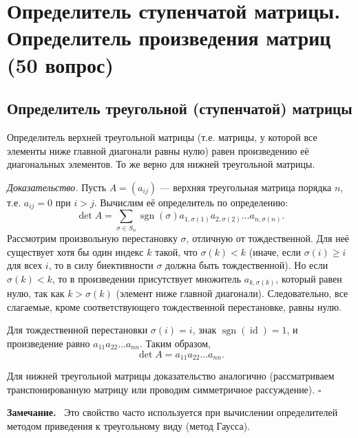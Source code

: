 \documentclass[a4paper,12pt]{article}
\newcommand{\myremark}{\textbf{Замечание.}\ }
\theoremstyle{definition}
\theoremstyle{plain}
\theoremstyle{remark}
\begin{document}
	\newpage
	\section{Определитель ступенчатой матрицы. Определитель произведения матриц (50 вопрос)}
	
	\subsection{Определитель треугольной (ступенчатой) матрицы}
	
	\begin{tcolorbox}[colback=blue!5, colframe=blue!40!black, title=Теорема]
		Определитель верхней треугольной матрицы (т.е. матрицы, у которой все элементы ниже главной диагонали равны нулю) равен произведению её диагональных элементов. То же верно для нижней треугольной матрицы.
	\end{tcolorbox}
	
	\medskip
	\textit{Доказательство.}
	Пусть \( A = (a_{ij}) \) — верхняя треугольная матрица порядка \( n \), т.е. \( a_{ij} = 0 \) при \( i > j \). Вычислим её определитель по определению:
	\[
	\det A = \sum_{\sigma \in S_n} \operatorname{sgn}(\sigma) a_{1,\sigma(1)} a_{2,\sigma(2)} \dots a_{n,\sigma(n)}.
	\]
	Рассмотрим произвольную перестановку \( \sigma \), отличную от тождественной. Для неё существует хотя бы один индекс \( k \) такой, что \( \sigma(k) < k \) (иначе, если \( \sigma(i) \geq i \) для всех \( i \), то в силу биективности \( \sigma \) должна быть тождественной). Но если \( \sigma(k) < k \), то в произведении присутствует множитель \( a_{k,\sigma(k)} \), который равен нулю, так как \( k > \sigma(k) \) (элемент ниже главной диагонали). Следовательно, все слагаемые, кроме соответствующего тождественной перестановке, равны нулю.
	
	Для тождественной перестановки \( \sigma(i) = i \), знак \( \operatorname{sgn}(\operatorname{id}) = 1 \), и произведение равно \( a_{11} a_{22} \dots a_{nn} \). Таким образом,
	\[
	\det A = a_{11} a_{22} \dots a_{nn}.
	\]
	
	Для нижней треугольной матрицы доказательство аналогично (рассматриваем транспонированную матрицу или проводим симметричное рассуждение). \hfill \(\square\)
	
	\myremark
	Это свойство часто используется при вычислении определителей методом приведения к треугольному виду (метод Гаусса).
	
\end{document}
